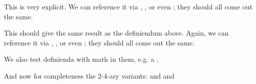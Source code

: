 \documentclass[minimal]{omdoc}
\begin{document}
\begin{module}[id=foomod]
  \begin{definition}[id=test.one]
    This  is very explicit. We can reference
    it via , , or even
    ; they should all come out the same.
  \end{definition}

  \begin{definition}[id=test.two]
    This  should give the same result as the
    definiendum above. Again, we can reference it via ,
    , or even ; they should
    all come out the same.
  \end{definition}

 \begin{definition}
   We also test definienda with math in them, e.g. a
   .

   And now for completeness the 2-4-ary variants: 
   and  and 
 \end{definition}
\end{module}
\end{document}
